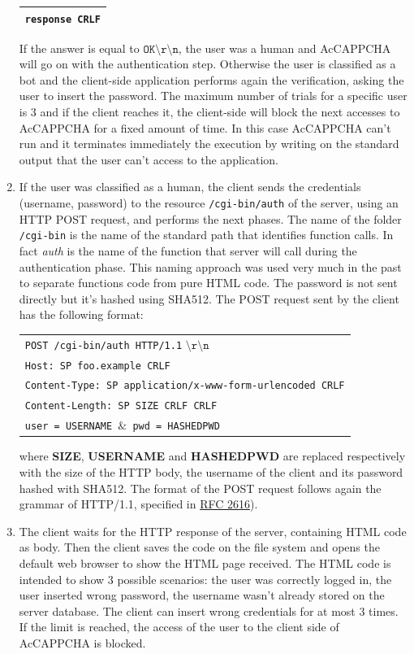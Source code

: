 \begin{enumerate}
{\begin{table}[H]
\begin{tabular}{|c|}
\hline
\texttt{response CRLF}\\
\hline
\end{tabular}
\end{table}
If the answer is equal to $\mathtt{OK\setminus r\setminus n}$, the user was a human and AcCAPPCHA will go on with the authentication step. Otherwise the user is classified as a bot and the client-side application performs again the verification, asking the user to insert the password. The maximum number of trials for a specific user is 3 and if the client reaches it, the client-side will block the next accesses to AcCAPPCHA for a fixed amount of time. In this case AcCAPPCHA can't run and it terminates immediately the execution by writing on the standard output that the user can't access to the application.}
\item{If the user was classified as a human, the client sends the credentials (username, password) to the resource \texttt{/cgi-bin/auth} of the server, using an HTTP POST request, and performs the next phases. The name of the folder \texttt{/cgi-bin} is the name of the standard path that identifies function calls. In fact \textit{auth} is the name of the function that server will call during the authentication phase. This naming approach was used very much in the past to separate functions code from pure HTML code. The password is not sent directly but it's hashed using SHA512. The POST request sent by the client has the following format:\\
\begin{table}[H]
\hspace{2cm}\centering\footnotesize
\begin{tabular}{|l|}
\hline
\texttt{POST /cgi-bin/auth HTTP/1.1} $\mathtt{\setminus r\setminus n}$\\
\texttt{Host: SP foo.example CRLF}\\
\texttt{Content-Type: SP application/x-www-form-urlencoded CRLF}\\
\texttt{Content-Length: SP SIZE CRLF CRLF}\\
\texttt{user = USERNAME $\mathtt{\&}$ pwd = HASHEDPWD}\\
\hline
\end{tabular}
\end{table}
where \textbf{SIZE}, \textbf{USERNAME} and \textbf{HASHEDPWD} are replaced respectively with the size of the HTTP body, the username of the client and its password hashed with SHA512. The format of the POST request follows again the grammar of HTTP/1.1, specified in \href{https://tools.ietf.org/html/rfc2616}{RFC 2616}).
}
\item{The client waits for the HTTP response of the server, containing HTML code as body. Then the client saves the code on the file system and opens the default web browser to show the HTML page received. The HTML code is intended to show 3 possible scenarios: the user was correctly logged in, the user inserted wrong password, the username wasn't already stored on the server database. The client can insert wrong credentials for at most 3 times. If the limit is reached, the access of the user to the client side of AcCAPPCHA is blocked.}
\end{enumerate}
